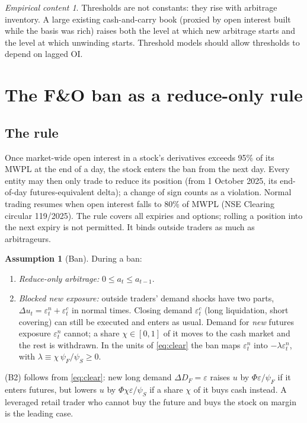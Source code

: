\documentclass[11pt,a4paper]{article}
\theoremstyle{plain}
\theoremstyle{definition}
\newtheorem{assumption}{Assumption}
\theoremstyle{remark}
\newtheorem*{test}{Empirical content}
\begin{document}
\begin{test}
Thresholds are not constants: they rise with arbitrage inventory. A large existing cash-and-carry book (proxied by
open interest built while the basis was rich) raises both the level at which new arbitrage starts and the level at which
unwinding starts. Threshold models should allow thresholds to depend on lagged OI.
\end{test}

\section{The F\&O ban as a reduce-only rule}\label{sec:ban}
\subsection{The rule}
Once market-wide open interest in a stock's derivatives exceeds 95\% of its MWPL at the end of a day, the stock enters the
ban from the next day. Every entity may then only trade to reduce its position (from 1 October 2025, its end-of-day
futures-equivalent delta); a change of sign counts as a violation. Normal trading resumes when open interest falls to
80\% of MWPL (NSE Clearing circular 119/2025). The rule covers all expiries and options; rolling a position into the next
expiry is not permitted. It binds outside traders as much as arbitrageurs.

\begin{assumption}[Ban]\label{as:ban}
During a ban:
\begin{enumerate}[label=(B\arabic*),leftmargin=2.2em,itemsep=1pt]
\item \emph{Reduce-only arbitrage:} $0\le a_t\le a_{t-1}$.
\item \emph{Blocked new exposure:} outside traders' demand shocks have two parts, $\Delta u_t=\varepsilon^n_t+\varepsilon^c_t$
in normal times. Closing demand $\varepsilon^c_t$ (long liquidation, short covering) can still be executed and enters as
usual. Demand for \emph{new} futures exposure $\varepsilon^n_t$ cannot; a share $\chi\in[0,1]$ of it moves to the cash
market and the rest is withdrawn. In the units of \eqref{eq:clear} the ban maps $\varepsilon^n_t$ into
$-\lambda\varepsilon^n_t$, with $\lambda\equiv\chi\,\psi_F/\psi_S\ge 0$.
\end{enumerate}
\end{assumption}
(B2) follows from \eqref{eq:clear}: new long demand $\Delta D_F=\varepsilon$ raises $u$ by $\Phi\varepsilon/\psi_F$ if it
enters futures, but lowers $u$ by $\Phi\chi\varepsilon/\psi_S$ if a share $\chi$ of it buys cash instead. A leveraged
retail trader who cannot buy the future and buys the stock on margin is the leading case.
\end{document}
